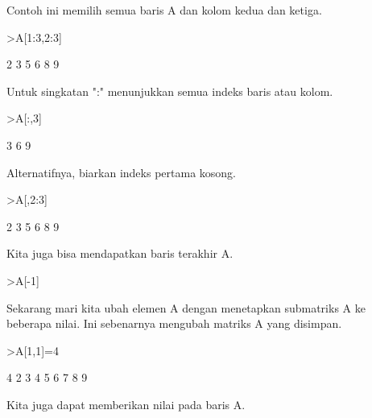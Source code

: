 \begin{eulernotebook}
\begin{eulercomment}
\begin{eulercomment}
\begin{eulercomment}
Contoh ini memilih semua baris A dan kolom kedua dan ketiga.
\end{eulercomment}
\begin{eulerprompt}
>A[1:3,2:3]
\end{eulerprompt}
\begin{euleroutput}
              2             3 
              5             6 
              8             9 
\end{euleroutput}
\begin{eulercomment}
Untuk singkatan ":" menunjukkan semua indeks baris atau kolom.
\end{eulercomment}
\begin{eulerprompt}
>A[:,3]
\end{eulerprompt}
\begin{euleroutput}
              3 
              6 
              9 
\end{euleroutput}
\begin{eulercomment}
Alternatifnya, biarkan indeks pertama kosong.
\end{eulercomment}
\begin{eulerprompt}
>A[,2:3]
\end{eulerprompt}
\begin{euleroutput}
              2             3 
              5             6 
              8             9 
\end{euleroutput}
\begin{eulercomment}
Kita juga bisa mendapatkan baris terakhir A.
\end{eulercomment}
\begin{eulerprompt}
>A[-1]
\end{eulerprompt}
\begin{euleroutput}
  [7,  8,  9]
\end{euleroutput}
\begin{eulercomment}
Sekarang mari kita ubah elemen A dengan menetapkan submatriks A ke
beberapa nilai. Ini sebenarnya mengubah matriks A yang disimpan.
\end{eulercomment}
\begin{eulerprompt}
>A[1,1]=4
\end{eulerprompt}
\begin{euleroutput}
              4             2             3 
              4             5             6 
              7             8             9 
\end{euleroutput}
\begin{eulercomment}
Kita juga dapat memberikan nilai pada baris A.

\end{eulercomment}
\end{eulercomment}
\end{eulercomment}
\end{eulernotebook}

